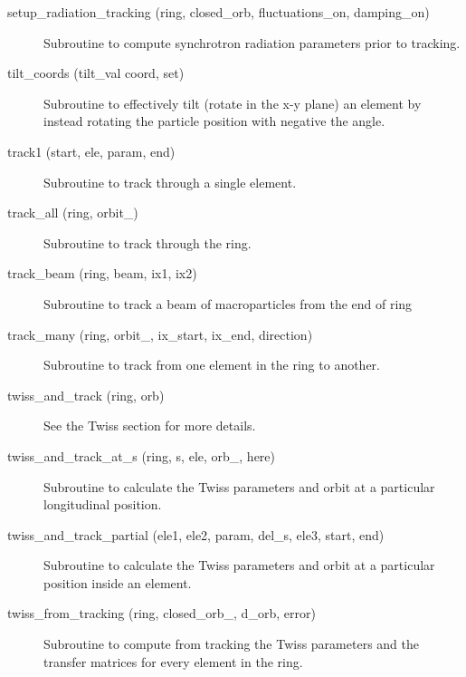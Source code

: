 \begin{description}
\item[setup\_radiation\_tracking (ring, closed\_orb, fluctuations\_on, damping\_on)] \Newline
Subroutine to compute synchrotron radiation parameters prior to tracking. 

\item[tilt\_coords (tilt\_val coord, set)] \Newline
Subroutine to effectively tilt (rotate in the x-y plane) an element by 
instead rotating the particle position with negative the angle. 

\item[track1 (start, ele, param, end)] \Newline
Subroutine to track through a single element. 

\item[track\_all (ring, orbit\_)] \Newline
Subroutine to track through the ring. 

\item[track\_beam (ring, beam, ix1, ix2)] \Newline 
     Subroutine to track a beam of macroparticles from the end of
     ring%

\item[track\_many (ring, orbit\_, ix\_start, ix\_end, direction)] \Newline
Subroutine to track from one element in the ring to another. 

\item[twiss\_and\_track (ring, orb)] \Newline
See the Twiss section for more details. 

\item[twiss\_and\_track\_at\_s (ring, s, ele, orb\_, here)] \Newline
Subroutine to calculate the Twiss parameters and orbit at a particular longitudinal position. 

\item[twiss\_and\_track\_partial (ele1, ele2, param, del\_s, ele3, start, end)] \Newline
Subroutine to calculate the Twiss parameters and orbit at a particular position inside an element. 

\item[twiss\_from\_tracking (ring, closed\_orb\_, d\_orb, error)] \Newline
Subroutine to compute from tracking the Twiss parameters and the transfer matrices 
for every element in the ring. 

\end{description}

